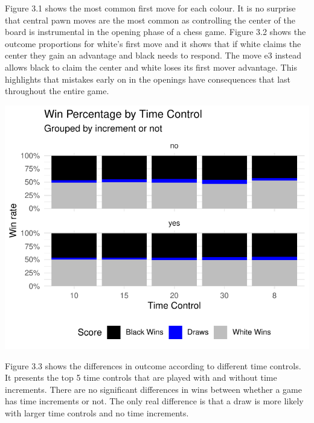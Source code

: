 \documentclass[12pt,preprint, authoryear]{elsarticle}
\let\origfigure\figure
\let\endorigfigure\endfigure
\renewenvironment{figure}[1][2] {
    \expandafter\origfigure\expandafter[H]
} {
    \endorigfigure
}
\numberwithin{equation}{section}
\numberwithin{figure}{section}
\numberwithin{table}{section}
\begin{document}
Figure 3.1 shows the most common first move for each colour. It is no
surprise that central pawn moves are the most common as controlling the
center of the board is instrumental in the opening phase of a chess
game. Figure 3.2 shows the outcome proportions for white's first move
and it shows that if white claims the center they gain an advantage and
black needs to respond. The move e3 instead allows black to claim the
center and white loses its first mover advantage. This highlights that
mistakes early on in the openings have consequences that last throughout
the entire game.

\begin{figure}[H]

{\centering \includegraphics{WriteUp_files/figure-latex/Descript3wins-1} 

}

\caption{Outcomes by Time Controls\label{Figure3}}\label{fig:Descript3wins}
\end{figure}

Figure 3.3 shows the differences in outcome according to different time
controls. It presents the top 5 time controls that are played with and
without time increments. There are no significant differences in wins
between whether a game has time increments or not. The only real
difference is that a draw is more likely with larger time controls and
no time increments.
\end{document}
